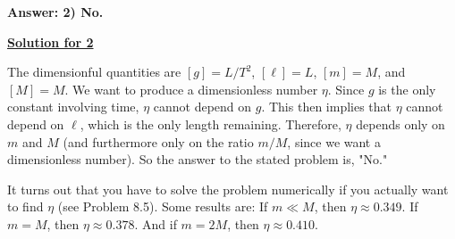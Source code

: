 \textbf{Answer: 2) No.}

\underline{\textbf{Solution for 2}}

The dimensionful quantities are $[g] = L/T^2$, $[\ell] = L$, $[m] = M$, and $[M] = M$. We want to produce a dimensionless number $\eta$. Since $g$ is the only constant involving time, $\eta$ cannot depend on $g$. This then implies that $\eta$ cannot depend on $\ell$, which is the only length remaining. Therefore, $\eta$ depends only on $m$ and $M$ (and furthermore only on the ratio $m/M$, since we want a dimensionless number). So the answer to the stated problem is, "No."

It turns out that you have to solve the problem numerically if you actually want to find $\eta$ (see Problem 8.5). Some results are: If $m \ll M$, then $\eta \approx 0.349$. If $m = M$, then $\eta \approx 0.378$. And if $m = 2M$, then $\eta \approx 0.410$.